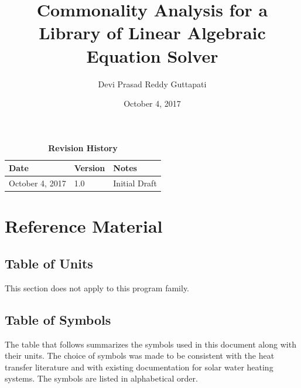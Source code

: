 \documentclass[12pt]{article}
\begin{document}
\title{Commonality Analysis for a Library of Linear Algebraic Equation Solver } 
\author{Devi Prasad Reddy Guttapati}
\date{October 4, 2017}


	
\maketitle
\pagebreak
{}
\tableofcontents

\begin{table}[bp]
\caption{\bf Revision History}
\begin{tabularx}{\textwidth}{p{3cm}p{2cm}X}
\toprule {\bf Date} & {\bf Version} & {\bf Notes}\\
\midrule
October 4, 2017 & 1.0 & Initial Draft\\

\bottomrule
\end{tabularx}
\end{table}

\section{Reference Material}



\subsection{Table of Units}

This section does not apply to this program family.

\subsection{Table of Symbols}

The table that follows summarizes the symbols used in this document along with
their units.  The choice of symbols was made to be consistent with the heat
transfer literature and with existing documentation for solar water heating
systems.  The symbols are listed in alphabetical order.
\end{document}
